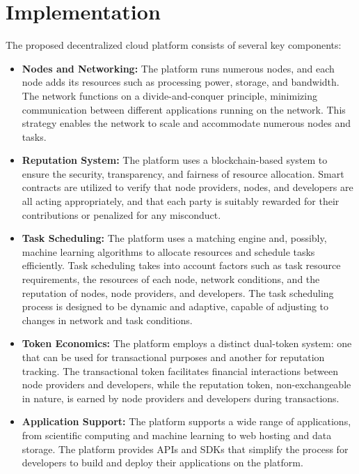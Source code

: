 \section{Implementation}
\label{sec:implementation}

The proposed decentralized cloud platform consists of several key components:

\begin{itemize}
    \item \textbf{Nodes and Networking:} The platform runs numerous nodes, and each node adds its resources such as processing power, storage, and bandwidth. The network functions on a divide-and-conquer principle, minimizing communication between different applications running on the network. This strategy enables the network to scale and accommodate numerous nodes and tasks.

    \item \textbf{Reputation System:} The platform uses a blockchain-based system to ensure the security, transparency, and fairness of resource allocation. Smart contracts are utilized to verify that node providers, nodes, and developers are all acting appropriately, and that each party is suitably rewarded for their contributions or penalized for any misconduct.

    \item \textbf{Task Scheduling:} The platform uses a matching engine and, possibly, machine learning algorithms to allocate resources and schedule tasks efficiently. Task scheduling takes into account factors such as task resource requirements, the resources of each node, network conditions, and the reputation of nodes, node providers, and developers. The task scheduling process is designed to be dynamic and adaptive, capable of adjusting to changes in network and task conditions.

    \item \textbf{Token Economics:} The platform employs a distinct dual-token system: one that can be used for transactional purposes and another for reputation tracking. The transactional token facilitates financial interactions between node providers and developers, while the reputation token, non-exchangeable in nature, is earned by node providers and developers during transactions.

    \item \textbf{Application Support:} The platform supports a wide range of applications, from scientific computing and machine learning to web hosting and data storage. The platform provides APIs and SDKs that simplify the process for developers to build and deploy their applications on the platform.
\end{itemize}



